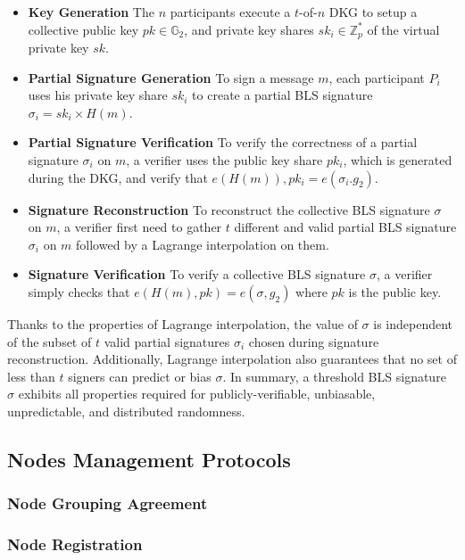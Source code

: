 \documentclass[11pt]{article}
\begin{document}
\begin{itemize}
    \item[] \textbf{Key Generation} The $n$ participants execute a $t$-of-$n$ DKG to setup a collective public key $pk \in \mathbb{G}_2$, and private key shares $sk_i \in \mathbb{Z}_p^*$ of the virtual private key $sk$.
    \item[] \textbf{Partial Signature Generation} To sign a message $m$, each participant $P_i$  uses his private key share $sk_i$  to create a partial BLS signature $\sigma_i=sk_i \times H(m)$.
    \item[] \textbf{Partial Signature Verification} To verify the correctness of a partial signature $\sigma_i$ on $m$, a verifier uses the public key share $pk_i$, which is generated during the DKG, and verify that $e(H(m)),pk_i=e(\sigma_i.g_2)$.
    \item[] \textbf{Signature Reconstruction} To reconstruct the collective BLS signature $\sigma$ on $m$, a verifier first need to gather $t$ different and valid partial BLS signature $\sigma_i$ on $m$ followed by a Lagrange interpolation on them.
    \item[] \textbf{Signature Verification} To verify a collective BLS signature $\sigma$, a verifier simply checks that $e(H(m),pk)=e(\sigma,g_2)$ where $pk$ is the public key.
\end{itemize}

Thanks to the properties of Lagrange interpolation, the value of $\sigma$ is independent of the subset of $t$ valid partial signatures $\sigma_i$ chosen during signature reconstruction. Additionally, Lagrange interpolation also guarantees that no set of less than $t$ signers can predict or bias $\sigma$. In summary, a threshold BLS signature $\sigma$  exhibits all properties required for publicly-verifiable, unbiasable, unpredictable, and distributed randomness.

\subsection{Nodes Management Protocols}

\subsubsection{Node Grouping Agreement}

\subsubsection{Node Registration}
\end{document}
